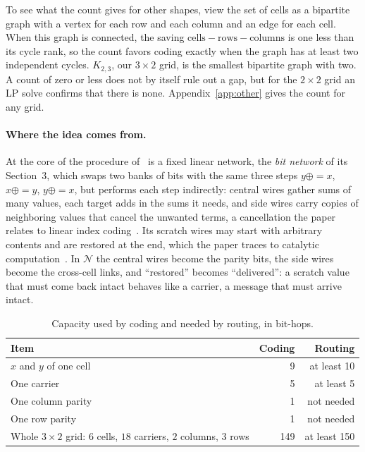 \documentclass[11pt]{article}
\newcommand{\xeq}{\mathrel{\oplus\!\!=}}
\begin{document}
To see what the count gives for other shapes, view the set of cells as a bipartite graph with a vertex for each row and each column and an edge for each cell. When this graph is connected, the saving $\text{cells}-\text{rows}-\text{columns}$ is one less than its cycle rank, so the count favors coding exactly when the graph has at least two independent cycles. $K_{2,3}$, our $3\times2$ grid, is the smallest bipartite graph with two. A count of zero or less does not by itself rule out a gap, but for the $2\times2$ grid an LP solve confirms that there is none. Appendix~\ref{app:other} gives the count for any grid.

\paragraph{Where the idea comes from.} At the core of the procedure of~\cite{OAI26} is a fixed linear network, the \emph{bit network} of its Section~3, which swaps two banks of bits with the same three steps $y\xeq x$, $x\xeq y$, $y\xeq x$, but performs each step indirectly: central wires gather sums of many values, each target adds in the sums it needs, and side wires carry copies of neighboring values that cancel the unwanted terms, a cancellation the paper relates to linear index coding~\cite{BBJK06}. Its scratch wires may start with arbitrary contents and are restored at the end, which the paper traces to catalytic computation~\cite{BCKLS14}. In $\mathcal N$ the central wires become the parity bits, the side wires become the cross-cell links, and ``restored'' becomes ``delivered'': a scratch value that must come back intact behaves like a carrier, a message that must arrive intact.

\begin{table}[ht]
\centering
\begin{tabular}{@{}l r r@{}}
\toprule
Item & Coding & Routing\\
\midrule
$x$ and $y$ of one cell & 9 & at least 10\\
One carrier & 5 & at least 5\\
One column parity & 1 & not needed\\
One row parity & 1 & not needed\\
\midrule
Whole $3\times2$ grid: $6$ cells, $18$ carriers, $2$ columns, $3$ rows & 149 & at least 150\\
\bottomrule
\end{tabular}
\caption{Capacity used by coding and needed by routing, in bit-hops.}
\label{tab:count}
\end{table}
\end{document}

